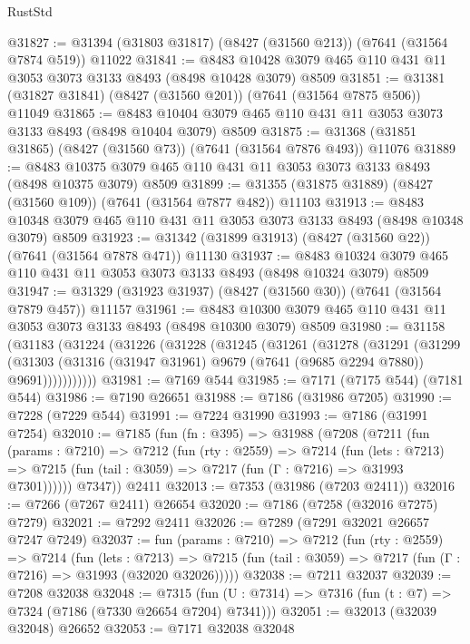\begin{lexlean}{RustStd}
\begin{coremodule}
{\begin{coremodule}
{{{{{{{{{{{{{{{{{{{{{{{{{{{{{{{{@31827 := @31394 (@31803 @31817) (@8427 (@31560 @213)) (@7641 (@31564 @7874 @519)) @11022
@31841 := @8483 @10428 @3079 @465 @110 @431 @11 @3053 @3073 @3133 @8493 (@8498 @10428 @3079) @8509
@31851 := @31381 (@31827 @31841) (@8427 (@31560 @201)) (@7641 (@31564 @7875 @506)) @11049
@31865 := @8483 @10404 @3079 @465 @110 @431 @11 @3053 @3073 @3133 @8493 (@8498 @10404 @3079) @8509
@31875 := @31368 (@31851 @31865) (@8427 (@31560 @73)) (@7641 (@31564 @7876 @493)) @11076
@31889 := @8483 @10375 @3079 @465 @110 @431 @11 @3053 @3073 @3133 @8493 (@8498 @10375 @3079) @8509
@31899 := @31355 (@31875 @31889) (@8427 (@31560 @109)) (@7641 (@31564 @7877 @482)) @11103
@31913 := @8483 @10348 @3079 @465 @110 @431 @11 @3053 @3073 @3133 @8493 (@8498 @10348 @3079) @8509
@31923 := @31342 (@31899 @31913) (@8427 (@31560 @22)) (@7641 (@31564 @7878 @471)) @11130
@31937 := @8483 @10324 @3079 @465 @110 @431 @11 @3053 @3073 @3133 @8493 (@8498 @10324 @3079) @8509
@31947 := @31329 (@31923 @31937) (@8427 (@31560 @30)) (@7641 (@31564 @7879 @457)) @11157
@31961 := @8483 @10300 @3079 @465 @110 @431 @11 @3053 @3073 @3133 @8493 (@8498 @10300 @3079) @8509
@31980 := @31158
    (@31183
      (@31224
        (@31226
          (@31228
            (@31245
              (@31261
                (@31278
                  (@31291
                    (@31299
                      (@31303
                        (@31316 (@31947 @31961) @9679 (@7641 (@9685 @2294 @7880)) @9691)))))))))))
@31981 := @7169 @544
@31985 := @7171 (@7175 @544) (@7181 @544)
@31986 := @7190 @26651
@31988 := @7186 (@31986 @7205)
@31990 := @7228 (@7229 @544)
@31991 := @7224 @31990
@31993 := @7186 (@31991 @7254)
@32010 := @7185
    (fun (fn : @395) =>
    @31988
      (@7208
        (@7211
          (fun (params : @7210) =>
          @7212
            (fun (rty : @2559) =>
            @7214
              (fun (lets : @7213) =>
              @7215 (fun (tail : @3059) => @7217 (fun (Γ : @7216) => @31993 @7301))))))
        @7347))
    @2411
@32013 := @7353 (@31986 (@7203 @2411))
@32016 := @7266 (@7267 @2411) @26654
@32020 := @7186 (@7258 (@32016 @7275) @7279)
@32021 := @7292 @2411
@32026 := @7289 (@7291 @32021 @26657 @7247 @7249)
@32037 := fun (params : @7210) =>
  @7212
    (fun (rty : @2559) =>
    @7214
      (fun (lets : @7213) =>
      @7215 (fun (tail : @3059) => @7217 (fun (Γ : @7216) => @31993 (@32020 @32026)))))
@32038 := @7211 @32037
@32039 := @7208 @32038
@32048 := @7315
    (fun (U : @7314) => @7316 (fun (t : @7) => @7324 (@7186 (@7330 @26654 @7204) @7341)))
@32051 := @32013 (@32039 @32048) @26652
@32053 := @7171 @32038 @32048
}}}}}}}}}}}}}}}}}}}}}}}}}}}}}}}}
\end{coremodule}}
\end{coremodule}
\end{lexlean}
